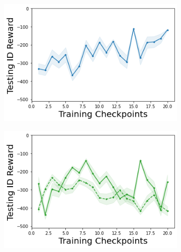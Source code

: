 \begin{figure}
\begin{subfigure}{.24\textwidth}
    \end{subfigure}
    \begin{subfigure}{.24\textwidth}
        \includegraphics[width=\textwidth]{sections/011_icml2022/resources/DKL-Acrobot-v1-mean_reward_-testing-strategy.png}
    \end{subfigure}
    \begin{subfigure}{.24\textwidth}
        \includegraphics[width=\textwidth]{sections/011_icml2022/resources/PostNet-Acrobot-v1-mean_reward_-testing-strategy.png}
    \end{subfigure}
    

\end{figure}
